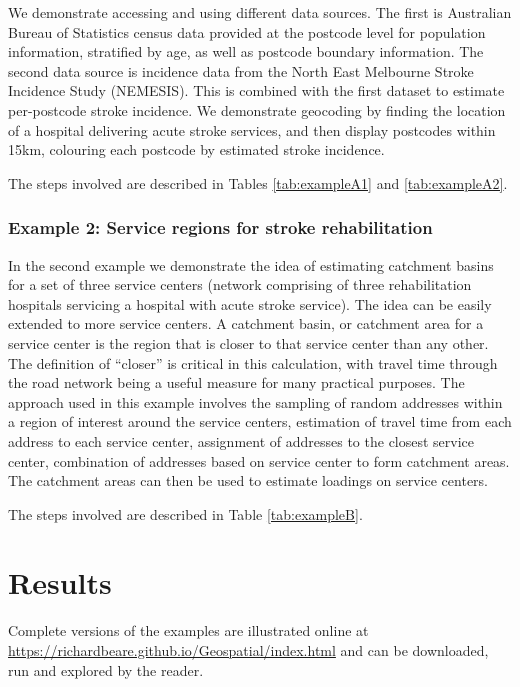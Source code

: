 \documentclass[utf8]{frontiersHLTH}
\begin{document}
We demonstrate accessing and using different data sources. The first is
Australian Bureau of Statistics census data provided at the postcode
level for population information, stratified by age, as well as postcode
boundary information. The second data source is incidence data from the
North East Melbourne Stroke Incidence Study (NEMESIS)\cite{thrift_stroke_2000}. This is combined
with the first dataset to estimate per-postcode stroke incidence. We
demonstrate geocoding by finding the location of a hospital delivering
acute stroke services, and then display postcodes within 15km, colouring
each postcode by estimated stroke incidence.

The steps involved are described in Tables \ref{tab:exampleA1} and \ref{tab:exampleA2}.

\subsubsection{Example 2: Service regions for stroke
rehabilitation}\label{example-2-service-regions-for-stroke-rehabilitation}

In the second example we demonstrate the idea of estimating catchment
basins for a set of three service centers (network comprising of three rehabilitation hospitals servicing a hospital with acute stroke service). The idea can be easily
extended to more service centers. A catchment basin, or catchment area
for a service center is the region that is closer to that service center
than any other. The definition of ``closer'' is critical in this
calculation, with travel time through the road network being a useful
measure for many practical purposes. The approach used in this example
involves the sampling of random addresses within a region of interest
around the service centers, estimation of travel time from each address
to each service center, assignment of addresses to the closest service
center, combination of addresses based on service center to form
catchment areas. The catchment areas can then be used to estimate
loadings on service centers.

The steps involved are described in Table \ref{tab:exampleB}.

\section{Results}
Complete versions of the examples are illustrated online at \href{https://richardbeare.github.io/Geospatial/index.html}{https://richardbeare.github.io/Geospatial/index.html} and can be downloaded, run and explored by the reader.
\end{document}
